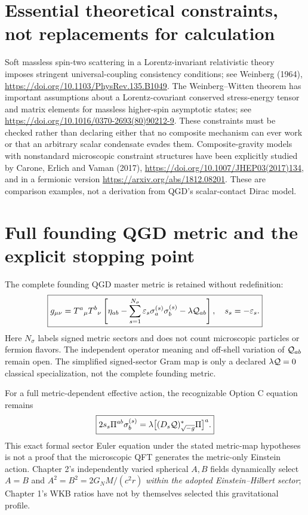 \documentclass[11pt,a4paper]{article}
\begin{document}
\section{Essential theoretical constraints, not replacements for calculation}
Soft massless spin-two scattering in a Lorentz-invariant relativistic theory imposes stringent universal-coupling consistency conditions; see Weinberg (1964), \url{https://doi.org/10.1103/PhysRev.135.B1049}. The Weinberg--Witten theorem has important assumptions about a Lorentz-covariant conserved stress-energy tensor and matrix elements for massless higher-spin asymptotic states; see \url{https://doi.org/10.1016/0370-2693(80)90212-9}. These constraints must be checked rather than declaring either that no composite mechanism can ever work or that an arbitrary scalar condensate evades them. Composite-gravity models with nonstandard microscopic constraint structures have been explicitly studied by Carone, Erlich and Vaman (2017), \url{https://doi.org/10.1007/JHEP03(2017)134}, and in a fermionic version \url{https://arxiv.org/abs/1812.08201}. These are comparison examples, not a derivation from QGD's scalar-contact Dirac model.

\section{Full founding QGD metric and the explicit stopping point}
The complete founding QGD master metric is retained without redefinition:
\begin{equation}\label{eq:master}
\boxed{g_{\mu\nu}=T^a{}_{\mu}T^b{}_{\nu}\left[\eta_{ab}-\sum_{s=1}^{N_\sigma}\varepsilon_s\sigma_a^{(s)}\sigma_b^{(s)}-\lambda\mathcal Q_{ab}\right],\quad s_s=-\varepsilon_s.}
\end{equation}
Here $N_\sigma$ labels signed metric sectors and does not count microscopic particles or fermion flavors. The independent operator meaning and off-shell variation of $\mathcal Q_{ab}$ remain open. The simplified signed-sector Gram map is only a declared $\lambda\mathcal Q=0$ classical specialization, not the complete founding metric.

For a full metric-dependent effective action, the recognizable Option C equation remains
\begin{equation}\label{eq:OptionC}
\boxed{2s_s\Pi^{ab}\sigma_b^{(s)}=\lambda\big[(D_s\mathcal Q)^*_{\sqrt{-g}}\Pi\big]^a.}
\end{equation}
This exact formal sector Euler equation under the stated metric-map hypotheses is not a proof that the microscopic QFT generates the metric-only Einstein action. Chapter 2's independently varied spherical $A,B$ fields dynamically select $A=B$ and $A^2=B^2=2G_NM/(c^2r)$ \emph{within the adopted Einstein--Hilbert sector}; Chapter 1's WKB ratios have not by themselves selected this gravitational profile.
\end{document}
